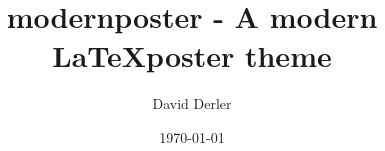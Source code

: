 \documentclass{article}
\title{modernposter - A modern \LaTeX poster theme}
\author{David Derler}
\date{\today}
\begin{document}
  \maketitle

  \begin{abstract}
    
  \end{abstract}
\end{document}
